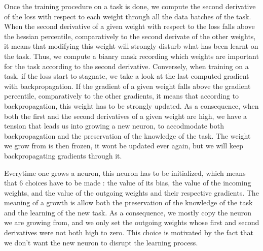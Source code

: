 \documentclass[11pt]{article}
\begin{document}
\vspace{2mm}
\noindent
Once the training procedure on a task is done, we compute the second derivative of the loss with respect to each weight through all the data batches of the task. When the second derivative of a given weight with respect to the loss falls above the hessian percentile, comparatively to the second derivate of the other weights, it means that modifying this weight will strongly disturb what has been learnt on the task. Thus, we compute a bianry mask recording which weights are important for the task according to the second derivative. Conversely, when training on a task, if the loss start to stagnate, we take a look at the last computed gradient with backpropagation. If the gradient of a given weight falls above the gradient percentile, comparatively to the other gradients, it means that according to backpropagation, this weight has to be strongly updated. As a consequence, when both the first and the second derivatives of a given weight are high, we have a tension that leads us into growing a new neuron, to accodmodate both backpropagation and the preservation of the knowledge of the task. The weight we grow from is then frozen, it wont be updated ever again, but we will keep backpropagating gradients through it. 

\vspace{2mm}
\noindent
Everytime one grows a neuron, this neuron has to be initialized, which means that 6 choices have to be made : the value of its bias, the value of the incoming weights, and the value of the outgoing weights and their respective gradients. The meaning of a growth is allow both the preservation of the knowledge of the task and the learning of the new task. As a consequence, we mostly copy the neuron we are growing from, and we only set the outgoing weights whose first and second derivatives were not both high to zero. This choice is motivated by the fact that we don't want the new neuron to disrupt the learning process.
\end{document}
